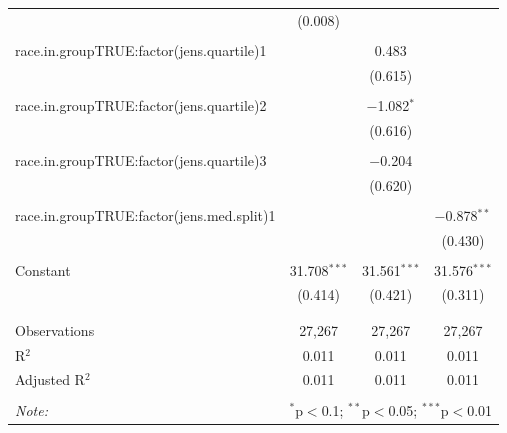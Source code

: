 \begin{table}[!htbp]
\begin{tabular}{@{\extracolsep{5pt}}lccc}
  & (0.008) &  &  \\ 
  & & & \\ 
 race.in.groupTRUE:factor(jens.quartile)1 &  & 0.483 &  \\ 
  &  & (0.615) &  \\ 
  & & & \\ 
 race.in.groupTRUE:factor(jens.quartile)2 &  & $-$1.082$^{*}$ &  \\ 
  &  & (0.616) &  \\ 
  & & & \\ 
 race.in.groupTRUE:factor(jens.quartile)3 &  & $-$0.204 &  \\ 
  &  & (0.620) &  \\ 
  & & & \\ 
 race.in.groupTRUE:factor(jens.med.split)1 &  &  & $-$0.878$^{**}$ \\ 
  &  &  & (0.430) \\ 
  & & & \\ 
 Constant & 31.708$^{***}$ & 31.561$^{***}$ & 31.576$^{***}$ \\ 
  & (0.414) & (0.421) & (0.311) \\ 
  & & & \\ 
\hline \\[-1.8ex] 
Observations & 27,267 & 27,267 & 27,267 \\ 
R$^{2}$ & 0.011 & 0.011 & 0.011 \\ 
Adjusted R$^{2}$ & 0.011 & 0.011 & 0.011 \\ 
\hline 
\hline \\[-1.8ex] 
\textit{Note:}  & \multicolumn{3}{r}{$^{*}$p$<$0.1; $^{**}$p$<$0.05; $^{***}$p$<$0.01} \\ 
\end{tabular} 
\end{table} 
